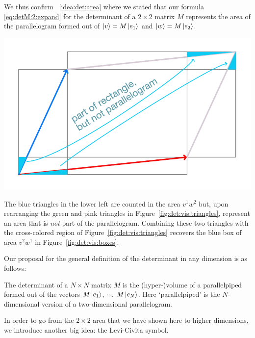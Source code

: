 \documentclass[12pt, oneside]{report}    %
\begin{document}
\bigskip
We thus confirm \bigidearef{}~\ref{idea:det:area} where we stated that our formula \eqref{eq:detM:2:expand} for the determinant of a $2\times 2$ matrix $M$ represents the area of the parallelogram formed out of $\left|v\right\rangle=M\left|e_1\right\rangle$ and $\left|w\right\rangle = M\left|e_2\right\rangle$.

\begin{marginfigure}%
    \includegraphics[width=\textwidth]{figures/det TwoPiecesofDetExtraTeal.pdf}
    \caption{The blue triangles in the lower left are counted in the area $v^1w^2$ but, upon rearranging the green and pink triangles in Figure~\ref{fig:det:vis:triangles}, represent an area that is \emph{not} part of the parallelogram. Combining these two triangles with the cross-colored region of Figure~\ref{fig:det:vis:triangles} recovers the blue box of area $v^2w^1$ in Figure~\ref{fig:det:vis:boxes}.}
    \label{fig:det:vis:extra}
\end{marginfigure}


Our proposal for the general definition of the determinant in any dimension is as follows:
\begin{bigidea}\label{idea:det:volume}
The determinant of a $N\times N$ matrix $M$ is the (hyper-)volume of a parallelpiped formed out of the vectors $M\left|e_1\right\rangle$, $\cdots$, $M\left|e_N\right\rangle$. Here `parallelpiped' is the $N$-dimensional version of a two-dimensional parallelogram.
\end{bigidea}
In order to go from the $2\times 2$ area that we have shown here to higher dimensions, we introduce another big idea: the Levi-Civita symbol.
\end{document}
